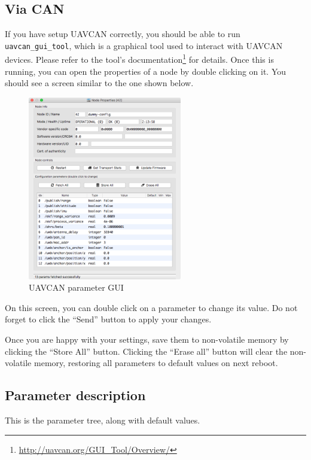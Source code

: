 \subsection{Via CAN}\label{via-can}

If you have setup UAVCAN correctly, you should be able to run
\texttt{uavcan\_gui\_tool}, which is a graphical tool used to interact
with UAVCAN devices. Please refer to
the tool's documentation\footnote{\url{http://uavcan.org/GUI_Tool/Overview/}}
for details. Once this is running, you can open the properties of a node
by double clicking on it. You should see a screen similar to the one
shown below.

\begin{figure}
\centering
\includegraphics[width=0.60000\textwidth]{figures/uavcan_gui.png}
\caption{UAVCAN parameter GUI}
\end{figure}

On this screen, you can double click on a parameter to change its value.
Do not forget to click the ``Send'' button to apply your changes.

Once you are happy with your settings, save them to non-volatile memory
by clicking the ``Store All'' button. Clicking the ``Erase all'' button
will clear the non-volatile memory, restoring all parameters to default
values on next reboot.

\subsection{Parameter description}\label{parameter-description}

This is the parameter tree, along with default values.


